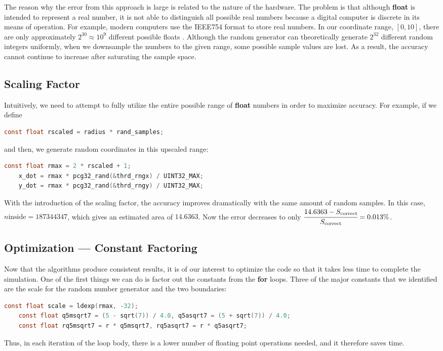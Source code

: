 \documentclass[a4paper]{article}
\begin{document}
The reason why the error from this approach is large is related to the nature of the hardware. The problem is that although \textbf{float} is intended to represent a real number, it is not able to distinguish all possible real numbers because a digital computer is discrete in its means of operation.
For example, modern computers use the IEEE754 format to store real numbers. In our coordinate range, \([0, 10]\), there are only approximately \(2^{30}\approx10^9\) different possible floats \autocite{ieee754}. Although the random generator can theoretically generate \(2^{32}\) different random integers uniformly, when we downsample the numbers to the given range, some possible sample values are lost. As a result, the accuracy cannot continue to increase after saturating the sample space.

\subsection{Scaling Factor}
Intuitively, we need to attempt to fully utilize the entire possible range of \textbf{float} numbers in order to maximize accuracy. For example, if we define
\begin{lstlisting}[language=C]
    const float rscaled = radius * rand_samples;
\end{lstlisting}
and then, we generate random coordinates in this upscaled range:
\begin{lstlisting}[language=C]
    const float rmax = 2 * rscaled + 1;
    x_dot = rmax * pcg32_rand(&thrd_rngx) / UINT32_MAX;
    y_dot = rmax * pcg32_rand(&thrd_rngy) / UINT32_MAX;
\end{lstlisting}

With the introduction of the scaling factor, the accuracy improves dramatically with the same amount of random samples. In this case, \(n\text{inside} = 187344347\), which gives an estimated area of \(14.6363\). Now the error decreases to only \(\cfrac{14.6363 - S_\text{correct}}{S_\text{correct}} = 0.013\% \).

\subsection{Optimization --- Constant Factoring}
Now that the algorithms produce consistent results, it is of our interest to optimize the code so that it takes less time to complete the simulation. One of the first things we can do is factor out the constants from the \textbf{for} loops. Three of the major constants that we identified are the scale for the random number generator and the two boundaries:
\begin{lstlisting}[language=C]
    const float scale = ldexp(rmax, -32);
    const float q5msqrt7 = (5 - sqrt(7)) / 4.0, q5asqrt7 = (5 + sqrt(7)) / 4.0;
    const float rq5msqrt7 = r * q5msqrt7, rq5asqrt7 = r * q5asqrt7;
\end{lstlisting}
Thus, in each iteration of the loop body, there is a lower number of floating point operations needed, and it therefore saves time.
\end{document}
